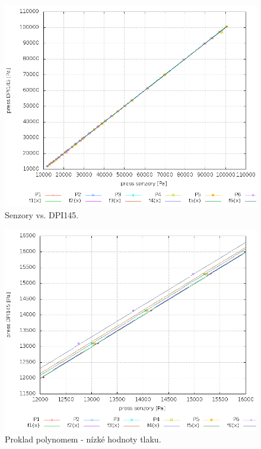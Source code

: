 \documentclass[12pt,a4paper,oneside]{article}
\begin{document}
\begin{figure} [htbp]
\centering
\includegraphics [width=130mm, origin=c] {./img/KorekceTlaku.png}
\caption{Senzory vs. DPI145.}
\label{KorekceTlaku}
\end{figure}

\begin{figure} [htbp]
\centering
\includegraphics [width=130mm, origin=c] {./img/KorekceTlakuZoom.png}
\caption{Proklad polynomem - nízké hodnoty tlaku.}
\label{KorekceTlakuZoom}
\end{figure}
\end{document}
